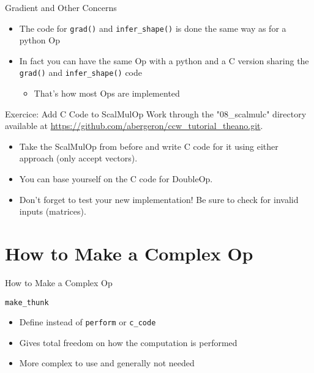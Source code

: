 \documentclass[utf8x]{beamer}
\newcommand{\code}[1]{\lstinline[emph={[2]}]|#1|}
\begin{document}
\begin{frame}{Gradient and Other Concerns}
\begin{itemize}
\item The code for \code{grad()} and \code{infer_shape()} is done the same way as for a python Op
\item In fact you can have the same Op with a python and a C version sharing the \code{grad()} and \code{infer_shape()} code
\begin{itemize}
\item That's how most Ops are implemented
\end{itemize}
\end{itemize}
\end{frame}

\begin{frame}{Exercice: Add C Code to ScalMulOp}
Work through the "08\_scalmulc" directory available at \url{https://github.com/abergeron/ccw_tutorial_theano.git}.
\begin{itemize}
\item Take the ScalMulOp from before and write C code for it using either approach (only accept vectors).
\item You can base yourself on the C code for DoubleOp.
\item Don't forget to test your new implementation! Be sure to check for invalid inputs (matrices).
\end{itemize}
\end{frame}

\section{How to Make a Complex Op}

\begin{frame}[plain]{}
\begin{center}
\Huge How to Make a Complex Op
\end{center}
\end{frame}

\begin{frame}{\code{make_thunk}}

\begin{itemize}
\item Define instead of \code{perform} or \code{c_code}
\item Gives total freedom on how the computation is performed
\item More complex to use and generally not needed
\end{itemize}
\end{frame}
\end{document}
